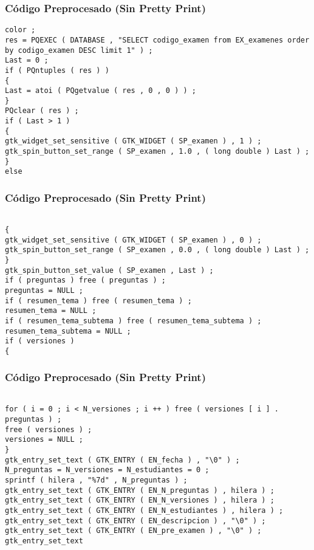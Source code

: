 \documentclass{beamer}
\begin{document}
\begin{frame}[fragile]
\frametitle{C\'odigo Preprocesado (Sin Pretty Print)}
\begin{lstlisting}[style=CStyle]
color ; 
res = PQEXEC ( DATABASE , "SELECT codigo_examen from EX_examenes order by codigo_examen DESC limit 1" ) ; 
Last = 0 ; 
if ( PQntuples ( res ) ) 
{ 
Last = atoi ( PQgetvalue ( res , 0 , 0 ) ) ; 
} 
PQclear ( res ) ; 
if ( Last > 1 ) 
{ 
gtk_widget_set_sensitive ( GTK_WIDGET ( SP_examen ) , 1 ) ; 
gtk_spin_button_set_range ( SP_examen , 1.0 , ( long double ) Last ) ; 
} 
else \end{lstlisting}
\end{frame}
\begin{frame}[fragile]
\frametitle{C\'odigo Preprocesado (Sin Pretty Print)}
\begin{lstlisting}[style=CStyle]

{ 
gtk_widget_set_sensitive ( GTK_WIDGET ( SP_examen ) , 0 ) ; 
gtk_spin_button_set_range ( SP_examen , 0.0 , ( long double ) Last ) ; 
} 
gtk_spin_button_set_value ( SP_examen , Last ) ; 
if ( preguntas ) free ( preguntas ) ; 
preguntas = NULL ; 
if ( resumen_tema ) free ( resumen_tema ) ; 
resumen_tema = NULL ; 
if ( resumen_tema_subtema ) free ( resumen_tema_subtema ) ; 
resumen_tema_subtema = NULL ; 
if ( versiones ) 
{ \end{lstlisting}
\end{frame}
\begin{frame}[fragile]
\frametitle{C\'odigo Preprocesado (Sin Pretty Print)}
\begin{lstlisting}[style=CStyle]

for ( i = 0 ; i < N_versiones ; i ++ ) free ( versiones [ i ] . preguntas ) ; 
free ( versiones ) ; 
versiones = NULL ; 
} 
gtk_entry_set_text ( GTK_ENTRY ( EN_fecha ) , "\0" ) ; 
N_preguntas = N_versiones = N_estudiantes = 0 ; 
sprintf ( hilera , "%7d" , N_preguntas ) ; 
gtk_entry_set_text ( GTK_ENTRY ( EN_N_preguntas ) , hilera ) ; 
gtk_entry_set_text ( GTK_ENTRY ( EN_N_versiones ) , hilera ) ; 
gtk_entry_set_text ( GTK_ENTRY ( EN_N_estudiantes ) , hilera ) ; 
gtk_entry_set_text ( GTK_ENTRY ( EN_descripcion ) , "\0" ) ; 
gtk_entry_set_text ( GTK_ENTRY ( EN_pre_examen ) , "\0" ) ; 
gtk_entry_set_text \end{lstlisting}
\end{frame}
\end{document}
